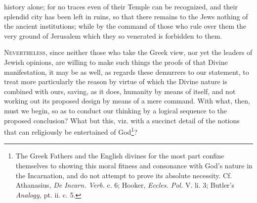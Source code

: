 history alone; for no traces even of their Temple can be recognized, and their splendid city has been left in ruins, so that there remains to the Jews nothing of the ancient institutions; while by the command of those who rule over them the very ground of Jerusalem which they so venerated is forbidden to them.


\textsc{Nevertheless}, since neither those who take the Greek view, nor yet the leaders of Jewish opinions, are willing to make such things the proofs of that Divine manifestation, it may be as well, as regards these demurrers to our statement, to treat more particularly the reason by virtue of which the Divine nature is combined with ours, saving, as it does, humanity by means of itself, and not working out its proposed design by means of a mere command. With what, then, must we begin, so as to conduct our thinking by a logical sequence to the proposed conclusion? What but this, viz. with a succinct detail of the notions that can religiously be entertained of God\footnote{The Greek Fathers and the English divines for the most part confine themselves to showing this moral fitness and consonance with God’s nature in the Incarnation, and do not attempt to prove its absolute necessity. Cf. Athanasius, \emph{De Incarn. Verb.} c. 6; Hooker, \emph{Eccles. Pol.} V. li. 3; Butler’s \emph{Analogy,} pt. ii. c. 5.}?



